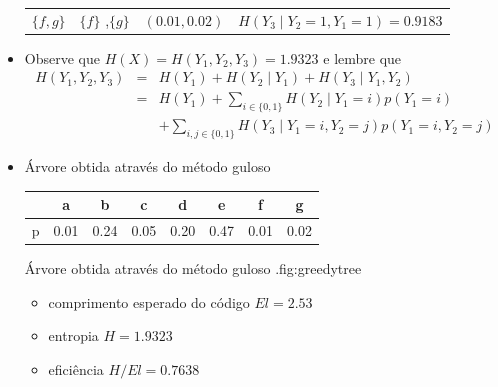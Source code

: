 \begin{frame}[allowframebreaks]
\begin{itemize}
\begin{scriptsize}
\begin{tabular}{c|c|c|c}
	$\{f,g\}$		& $\{f\}$ ,$\{g\}$		& $(0.01, 0.02)$ 	& $H(Y_3 \mid Y_2 = 1, Y_1 = 1) = 0.9183$ 
	\end{tabular}
	\end{scriptsize}
  \item Observe que $H(X) = H(Y_1, Y_2, Y_3) = 1.9323$ e lembre que
	\begin{eqnarray}
	H(Y_1, Y_2, Y_3) &=& H(Y_1) + H(Y_2 \mid Y_1) + H(Y_3 \mid Y_1 , Y_2) \\
			&=& H(Y_1) + \sum_{i \in \{0,1\}} H(Y_2 \mid Y_1 = i) p(Y_1 = i)  \nonumber \\
			&&	+ \sum_{i,j \in \{0,1\}} H(Y_3 \mid Y_1 = i, Y_2 = j) p(Y_1 = i, Y_2 = j) \nonumber
	\end{eqnarray}


  \framebreak
  \item Árvore obtida através do método guloso

        \begin{tabular}{c|c|c|c|c|c|c|c}
                  & a    & b    & c    & d    & e    & f    & g \\ \hline
                p & 0.01 & 0.24 & 0.05 & 0.20 & 0.47 & 0.01 & 0.02
        \end{tabular}


	{Árvore obtida através do método guloso \citep{bilmes2013}.}{fig:greedytree}

	\begin{itemize}
	\item comprimento esperado do código $E l = 2.53$
	\item entropia $H=1.9323$
	\item eficiência $H/E l = 0.7638$
	\end{itemize}


\end{itemize}
\end{frame}
